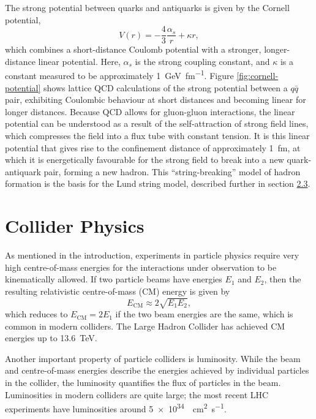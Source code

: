 \documentclass[12pt,a4paper]{report}
\begin{document}
The strong potential between quarks and antiquarks is given by the Cornell potential,
\begin{equation}\label{eq:cornell-potential}
  V(r) = -\frac{4}{3} \frac{\alpha_s}{r} + \kappa r,
\end{equation}
which combines a short-distance Coulomb potential with a stronger, longer-distance linear potential. Here, $\alpha_s$ is the strong coupling constant, and $\kappa$ is a constant measured to be approximately \qty{1}{\giga\electronvolt\per\femto\meter}. Figure \ref{fig:cornell-potential} shows lattice QCD calculations of the strong potential between a $q\bar{q}$ pair, exhibiting Coulombic behaviour at short distances and becoming linear for longer distances. Because QCD allows for gluon-gluon interactions, the linear potential can be understood as a result of the self-attraction of strong field lines, which compresses the field into a flux tube with constant tension. It is this linear potential that gives rise to the confinement distance of approximately \qty{1}{\femto\meter}, at which it is energetically favourable for the strong field to break into a new quark-antiquark pair, forming a new hadron. This ``string-breaking'' model of hadron formation is the basis for the Lund string model, described further in section \hyperref[sec:lsm]{2.3}.

\section{Collider Physics}
As mentioned in the introduction, experiments in particle physics require very high centre-of-mass energies for the interactions under observation to be kinematically allowed. If two particle beams have energies $E_1$ and $E_2$, then the resulting relativistic centre-of-mass (CM) energy is given by
\begin{equation}
  E_\text{CM} \approx 2 \sqrt{E_1 E_2},
\end{equation}
which reduces to $E_\text{CM}=2E_1$ if the two beam energies are the same, which is common in modern colliders. The Large Hadron Collider has achieved CM energies up to \qty{13.6}{\tera\electronvolt}.

Another important property of particle colliders is luminosity. While the beam and centre-of-mass energies describe the energies achieved by individual particles in the collider, the luminosity quantifies the flux of particles in the beam. Luminosities in modern colliders are quite large; the most recent LHC experiments have luminosities around \qty{5e34}{\per\square\centi\meter\per\second}.
\end{document}
